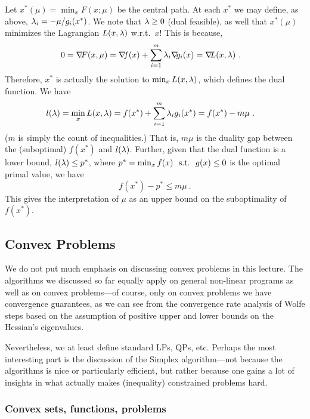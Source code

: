 Let $x^*(\mu) = \min_x F(x;\mu)$ be the central path. At each $x^*$
we may define, as above, $\lambda_i = -\mu/g_i(x^*)$. We note that $\lambda\ge0$
(dual feasible), as well that $x^*(\mu)$ minimizes the Lagrangian
$L(x,\lambda)$ w.r.t.\ $x$! This is because,
\begin{align}
0
&= \na F(x,\mu) 
 = \na f(x) + \sum_{i=1}^m \l_i \na g_i(x)
 = \na L(x,\l) ~.
\end{align}
Therefore, $x^*$ is actually the solution to $\min_x L(x,\lambda)$, which
defines the dual function. We have
\begin{align}
l(\lambda)
&= \min_x L(x,\lambda)
 = f(x^*) + \sum_{i=1}^m \lambda_i g_i(x^*)
 = f(x^*) - m \mu ~.
\end{align}
($m$ is simply the count of inequalities.)
That is, $m \mu$ is the duality gap between the (suboptimal)  $f(x^*)$ and $l(\lambda)$. Further, given that the
dual function is a lower bound, $l(\lambda) \le p^*$, where $p^*=\min_x f(x)
~~\text{s.t.}~~ g(x)\le 0$ is the optimal primal value, we have
\begin{equation}
f(x^*) - p^* \le m \mu ~.
\end{equation}
This gives the interpretation of $\mu$ as an upper bound on the suboptimality of $f(x^*)$.








\subsection{Convex Problems}

We do not put much emphasis on discussing convex problems in this
lecture. The algorithms we discussed so far equally apply on general
non-linear programs as well as on convex problems---of course, only on
convex problems we have convergence guarantees, as we
can see from the convergence rate analysis of Wolfe steps based on the
assumption of positive upper and lower bounds on the Hessian's
eigenvalues.

Nevertheless, we at least define standard LPs, QPs, etc. Perhaps the
most interesting part is the discussion of the Simplex algorithm---not
because the algorithms is nice or particularly efficient, but rather
because one gains a lot of insights in what actually makes
(inequality) constrained problems hard.

\subsubsection{Convex sets, functions, problems}\label{secCvx}

